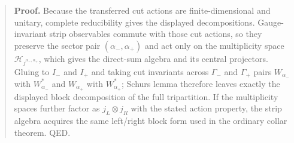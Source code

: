 \begin{quote}
\textbf{Proof.} Because the transferred cut actions are finite-dimensional and unitary, complete reducibility gives the displayed decompositions. Gauge-invariant strip observables commute with those cut actions, so they preserve the sector pair \((\alpha_-,\alpha_+)\) and act only on the multiplicity space \(\mathcal H_{j^{\alpha_-,\alpha_+}}\), which gives the direct-sum algebra and its central projectors. Gluing to \(I_-\) and \(I_+\) and taking cut invariants across \(\Gamma_-\) and \(\Gamma_+\) pairs \(W_{\alpha_-}\) with \(W_{\alpha_-}^{*}\) and \(W_{\alpha_+}\) with \(W_{\alpha_+}^{*}\); Schur\textquotesingle s lemma therefore leaves exactly the displayed block decomposition of the full tripartition. If the multiplicity spaces further factor as \(j_L\otimes j_R\) with the stated action property, the strip algebra acquires the same left/right block form used in the ordinary collar theorem. QED.
\end{quote}


